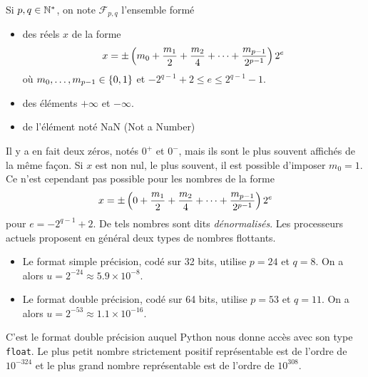 \documentclass{magnoliaold}
\begin{document}
\begin{definition}
Si $p,q\in{\mathbb{N}^*}$, on note $\mathcal{F}_{p,q}$ l'ensemble form\'e
\begin{itemize}
\item des réels $x$ de la forme
\[x=\pm\left(m_0+\frac{m_1}{2}+\frac{m_2}{4}+\cdots+\frac{m_{p-1}}{2^{p-1}}\right) 2^e\]
où $m_0,\ldots,m_{p-1}\in\left\{0,1\right\}$ et $-2^{q-1}+2\leq e\leq 2^{q-1}-1$.
\item des éléments $+\infty$ et $-\infty$.
\item de l'élément noté {\sc NaN} (Not a Number)
\end{itemize}
\end{definition}

\begin{remarques}
  \remarque Il y a en fait deux zéros, notés $0^+$ et $0^-$, mais ils sont le plus
  souvent affichés de la même façon.
\remarque Si $x$ est non nul, le plus souvent, il est possible d'imposer $m_0=1$. Ce n'est
  cependant pas possible pour les nombres de la forme
  \[x=\pm\left(0+\frac{m_1}{2}+\frac{m_2}{4}+\cdots+\frac{m_{p-1}}{2^{p-1}}\right) 2^e\]
  pour $e=-2^{q-1}+2$. De tels nombres sont dits \emph{dénormalisés}.
\remarque Les processeurs actuels proposent en général deux types de nombres flottants.
  \begin{itemize}
  \item Le format simple précision, codé sur 32 bits, utilise
  $p=24$ et $q=8$. On a alors $u=2^{-24}\approx 5.9\times 10^{-8}$.
\item Le format double précision, codé sur 64 bits, utilise $p=53$ et $q=11$.
  On a alors $u=2^{-53}\approx 1.1\times10^{-16}$.
  \end{itemize}
 C'est le format double précision auquel Python nous donne accès avec son type \verb_float_.  Le plus petit nombre strictement positif représentable est de l'ordre de $10^{-324}$ et le plus grand nombre représentable est de l'ordre de $10^{308}$.


\end{remarques}
\end{document}
